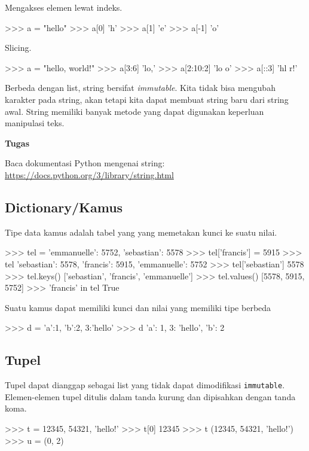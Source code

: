 Mengakses elemen lewat indeks.
\begin{pyconcode}
>>> a = "hello"
>>> a[0]
'h'
>>> a[1]
'e'
>>> a[-1]
'o'
\end{pyconcode}

Slicing.
\begin{pyconcode}
>>> a = "hello, world!"
>>> a[3:6]
'lo,'
>>> a[2:10:2]
'lo o'
>>> a[::3]
'hl r!'
\end{pyconcode}

Berbeda dengan list, string bersifat \textit{immutable}.
Kita tidak bisa mengubah karakter pada string, akan tetapi kita dapat
membuat string baru dari string awal.
String memiliki banyak metode yang dapat digunakan keperluan
manipulasi teks.

\begin{mdframed}[backgroundcolor=myframebg]
\textbf{Tugas}

Baca dokumentasi Python mengenai string:
\url{https://docs.python.org/3/library/string.html}
\end{mdframed}


\subsection{Dictionary/Kamus}

Tipe data kamus adalah tabel yang yang memetakan kunci ke suatu nilai.
\begin{pyconcode}
>>> tel = {'emmanuelle': 5752, 'sebastian': 5578}
>>> tel['francis'] = 5915 
>>> tel
{'sebastian': 5578, 'francis': 5915, 'emmanuelle': 5752}
>>> tel['sebastian']
5578
>>> tel.keys()
['sebastian', 'francis', 'emmanuelle']
>>> tel.values()
[5578, 5915, 5752]
>>> 'francis' in tel
True
\end{pyconcode}

Suatu kamus dapat memiliki kunci dan nilai yang memiliki tipe berbeda
\begin{pyconcode}
>>> d = {'a':1, 'b':2, 3:'hello'}
>>> d
{'a': 1, 3: 'hello', 'b': 2}
\end{pyconcode}


\subsection{Tupel}

Tupel dapat dianggap sebagai list yang tidak dapat dimodifikasi \texttt{immutable}.
Elemen-elemen tupel ditulis dalam tanda kurung dan dipisahkan dengan
tanda koma.
\begin{pyconcode}
>>> t = 12345, 54321, 'hello!'
>>> t[0]
12345
>>> t
(12345, 54321, 'hello!')
>>> u = (0, 2)
\end{pyconcode}